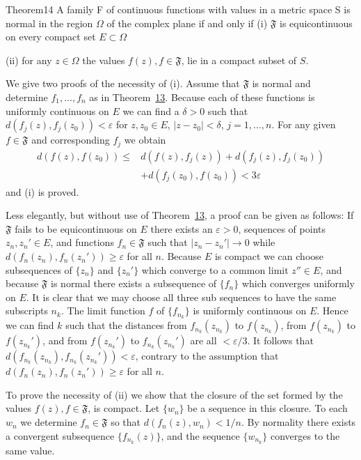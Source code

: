 \begin{originalstatement}{Theorem}{14}\label{thm:5.14}
A family F of continuous functions with values in a metric space S is normal in the region $\Omega$ of the complex plane if and only if
(i) $\mathfrak{F}$ is equicontinuous on every compact set $E\subset \Omega$

(ii) for any $z \in \Omega$ the values $f(z), f \in \mathfrak{F}$, lie in a compact subset of $S$.

\end{originalstatement}
We give two proofs of the necessity of (i). Assume that $\mathfrak{F}$ is normal and determine $f_{1},\ldots ,f_{n}$ as in Theorem~\hyperref[thm:5.13]{13}. Because each of these functions is uniformly continuous on $E$ we can find a $\delta >0$ such that $d(f_j(z),f_j(z_0)) < \varepsilon$ for $z,z_0\in E$, $|z - z_0| < \delta$, $j = 1,\dots ,n$. For any given $f\in \mathfrak{F}$ and corresponding $f_{j}$ we obtain
\begin{equation*}
\begin{aligned}
d(f(z),f(z_0))\leq{}&d(f(z),f_j(z))+d(f_j(z),f_j(z_0))\\
&+d(f_j(z_0),f(z_0))<3\varepsilon
\end{aligned}
\end{equation*}
and (i) is proved.

Less elegantly, but without use of Theorem~\hyperref[thm:5.13]{13}, a proof can be given as follows: If $\mathfrak{F}$ fails to be equicontinuous on $E$ there exists an $\varepsilon > 0$, sequences of points $z_n, z_n' \in E$, and functions $f_n \in \mathfrak{F}$ such that $|z_n - z_n'| \to 0$ while $d(f_n(z_n), f_n(z_n')) \geq \varepsilon$ for all $n$. Because $E$ is compact we can choose subsequences of $\{z_n\}$ and $\{z_n'\}$ which converge to a common limit $z'' \in E$, and because $\mathfrak{F}$ is normal there exists a subsequence of $\{f_n\}$ which converges uniformly on $E$. It is clear that we may choose all three sub%
%
sequences to have the same subscripts $n_k$. The limit function $f$ of $\{f_{n_k}\}$ is uniformly continuous on $E$. Hence we can find $k$ such that the distances from $f_{n_k}(z_{n_k})$ to $f(z_{n_k})$, from $f(z_{n_k})$ to $f(z_{n_k}')$, and from $f(z_{n_k}')$ to $f_{n_k}(z_{n_k}')$ are all $< \varepsilon / 3$. It follows that $d(f_{n_k}(z_{n_k}), f_{n_k}(z_{n_k}')) < \varepsilon$, contrary to the assumption that $d(f_n(z_n), f_n(z_n')) \geq \varepsilon$ for all $n$.

To prove the necessity of (ii) we show that the closure of the set formed by the values $f(z), f \in \mathfrak{F}$, is compact. Let $\{w_n\}$ be a sequence in this closure. To each $w_n$ we determine $f_n \in \mathfrak{F}$ so that $d(f_n(z), w_n) < 1/n$. By normality there exists a convergent subsequence $\{f_{n_k}(z)\}$, and the sequence $\{w_{n_k}\}$ converges to the same value.

